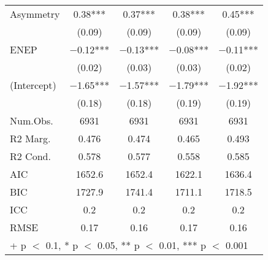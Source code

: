 \begin{table}
\begin{tabular}[t]{lcccc}
Asymmetry & \num{0.38}*** & \num{0.37}*** & \num{0.38}*** & \num{0.45}***\\
 & (\num{0.09}) & (\num{0.09}) & (\num{0.09}) & (\num{0.09})\\
ENEP & \num{-0.12}*** & \num{-0.13}*** & \num{-0.08}*** & \num{-0.11}***\\
 & (\num{0.02}) & (\num{0.03}) & (\num{0.03}) & (\num{0.02})\\
(Intercept) & \num{-1.65}*** & \num{-1.57}*** & \num{-1.79}*** & \num{-1.92}***\\
 & (\num{0.18}) & (\num{0.18}) & (\num{0.19}) & (\num{0.19})\\
\midrule
Num.Obs. & \num{6931} & \num{6931} & \num{6931} & \num{6931}\\
R2 Marg. & \num{0.476} & \num{0.474} & \num{0.465} & \num{0.493}\\
R2 Cond. & \num{0.578} & \num{0.577} & \num{0.558} & \num{0.585}\\
AIC & \num{1652.6} & \num{1652.4} & \num{1622.1} & \num{1636.4}\\
BIC & \num{1727.9} & \num{1741.4} & \num{1711.1} & \num{1718.5}\\
ICC & \num{0.2} & \num{0.2} & \num{0.2} & \num{0.2}\\
RMSE & \num{0.17} & \num{0.16} & \num{0.17} & \num{0.16}\\
\bottomrule
\multicolumn{5}{l}{\rule{0pt}{1em}+ p $<$ 0.1, * p $<$ 0.05, ** p $<$ 0.01, *** p $<$ 0.001}\\
\end{tabular}
\end{table}
